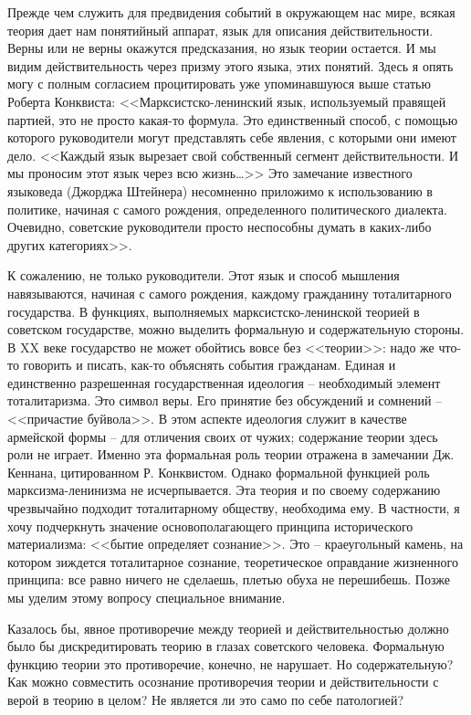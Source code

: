 \documentclass{book}
\begin{document}
Прежде чем служить для предвидения событий в окружаю­щем нас мире, всякая теория дает нам понятийный аппарат, язык для описания 
действительности. Верны или не верны окажутся предсказания, но язык теории остается. И мы видим действительность через призму 
этого языка, этих понятий. Здесь я опять могу с полным согласием процитировать уже упоминавшуюся выше статью Роберта Конквиста:
<<Марксистско-ленинский язык, используемый правящей пар­тией, это не просто какая-то формула. Это единственный спо­соб, с помощью 
которого руководители могут представлять себе явления, с которыми они имеют дело. <<Каждый язык вырезает свой собственный сегмент 
действительности. И мы проносим этот язык через всю жизнь\ldots>> Это замечание извест­ного языковеда (Джорджа Штейнера) 
несомненно приложимо к использованию в политике, начиная с самого рождения, опре­деленного политического диалекта. Очевидно, 
советские ру­ководители просто неспособны думать в каких-либо других категориях>>.

К сожалению, не только руководители. Этот язык и способ мышления навязываются, начиная с самого рождения, каждому гражданину 
тоталитарного государства. В функциях, выполняемых марксистско-ленинской теорией в советском государстве, можно выделить 
формальную и содержательную стороны. В XX веке государство не может обойтись вовсе без <<теории>>: надо же что-то говорить и 
писать, как-то объяснять события гражданам. Единая и единственно разрешенная государственная идеология -- необходимый элемент 
тоталитаризма. Это символ веры. Его принятие без обсуждений и сомнений -- <<причастие буйвола>>. В этом аспекте идеология служит 
в качестве армейской формы -- для отличения своих от чужих; содержание теории здесь роли не играет. Именно эта формальная роль 
теории отражена в замечании Дж. Кеннана, цитированном Р. Конквистом. Однако формальной функцией роль марксизма-ленинизма не 
исчерпывается. Эта теория и по своему содержанию чрезвычайно подходит тоталитарному обществу, необходима ему. В частности, я 
хочу подчеркнуть значение основополагающего прин­ципа исторического материализма: <<бытие определяет сознание>>. Это -- 
краеугольный камень, на котором зиждется тоталитарное сознание, теоретическое оправдание жизненного принципа: все равно ничего 
не сделаешь, плетью обуха не перешибешь. Позже мы уделим этому вопросу специальное внимание.

Казалось бы, явное противоречие между теорией и действительностью должно было бы дискредитировать теорию в глазах советского 
человека. Формальную функцию теории это противоречие, конечно, не нарушает. Но содержательную? Как можно совместить осознание 
противоречия теории и действительности с верой в теорию в целом? Не является ли это само по себе патологией?
\end{document}

